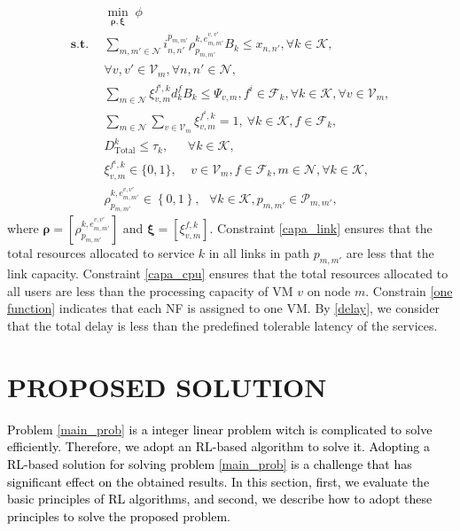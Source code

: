 \documentclass[20pt,twocolumn]{IEEEtran}
\begin{document}
	\begin{subequations}\label{main_prob}
	\begin{align}
		&	\min_{\boldsymbol{\rho}, \boldsymbol{\xi}}\;\phi 
		\\	\textbf{s.t.}~~&  \label{capa_link} 
	 \sum_{m,m'\in\mathcal{N}} i^{p_{m,m'}}_{{n,n'}}\rho^{k,e^{v,v'}_{m,m'}}_{p_{m,m'}}B_k\le x_{n,n'}, \forall k \in\mathcal{K},\\& \nonumber \forall v,v'\in\mathcal{V}_m,\forall n,n'\in\mathcal{N},
		\\&
	\sum_{m\in\mathcal{N}}	\xi^{f^{i},k}_{v,m}d^f_kB_k\le \Psi_{v,m},  f^i\in\mathcal{F}_k,\forall k\in\mathcal{K}, \forall v\in\mathcal{V}_{m},
		\label{capa_cpu}
		\\&  		
		\label{one function}
		\sum_{m\in\mathcal{N}}	\sum_{v\in\mathcal{V}_{m}}\xi_{v,m}^{f^i,k}= 1,~\forall k\in\mathcal{K}, f\in\mathcal{F}_k,
		\\&
		D_{\text{Total}}^k\le \tau_k, ~~~~~~~\forall k\in\mathcal{K}, \label{delay}
		\\&
		\xi_{v,m}^{f^{i},k}\in\{0,1\},~~~~~  v\in \mathcal{V}_{m},  f \in \mathcal{F}_{k},  m\in \mathcal{N}, \forall k \in \mathcal{K},
		\\&
		\rho^{k,e^{v,v'}_{m,m'}}_{{p}_{m,m'}}\in \left\lbrace 0,1\right\rbrace, ~~~ \forall
		k\in\mathcal{K}, p_{m,m'}\in\mathcal{P}_{m,m'}, 
	\end{align}
\end{subequations}
where $\boldsymbol{\rho}=[\rho^{k,e^{v,v'}_{m,m'}}_{{p}_{m,m'}}]$ and $\boldsymbol{\xi}=[\xi_{v,m}^{f,k}]$.
Constraint \eqref{capa_link} ensures that the total resources allocated to service $k$ in all links in path $p_{m,m'}$ are less that the link capacity. Constraint \eqref{capa_cpu} ensures that the total resources  allocated to all users are less than the processing capacity of VM $v$ on node $m$. Constrain \eqref{one function} indicates  that each NF is assigned to one VM. By \eqref{delay}, we consider that the total delay is less than the predefined  tolerable latency of the services.
\section{{PROPOSED SOLUTION }}\label{solution}
\textcolor{black}{Problem \eqref{main_prob} is a  integer linear problem witch is complicated to solve efficiently.  Therefore, we adopt an RL-based algorithm to solve it. Adopting a RL-based solution for solving problem \eqref{main_prob} is a challenge that has significant effect on the obtained  results. In this section, first, we  evaluate the basic principles of  RL algorithms, and second, we describe how to adopt these principles  to solve the proposed problem.}
\end{document}
